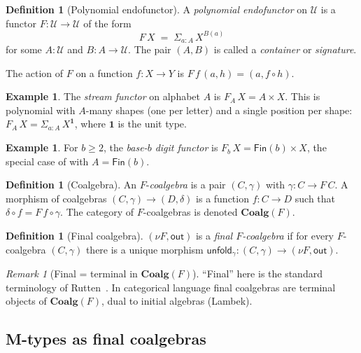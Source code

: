 \documentclass[12pt]{article}
\theoremstyle{definition}
\newtheorem{definition}[theorem]{Definition}
\newtheorem{example}[theorem]{Example}
\theoremstyle{remark}
\newtheorem{remark}[theorem]{Remark}
\newcommand{\Type}{\mathcal{U}}
\newcommand{\out}{\mathsf{out}}
\newcommand{\unfold}{\mathsf{unfold}}
\begin{document}
\begin{definition}[Polynomial endofunctor]
\label{def:poly}
A \emph{polynomial endofunctor} on $\Type$ is a functor
$F: \Type \to \Type$ of the form
\[
F\,X \;=\; \Sigma_{a:A}\,X^{B(a)}
\]
for some $A : \Type$ and $B : A \to \Type$. The pair $(A,B)$ is
called a \emph{container} or \emph{signature}.
\end{definition}

The action of $F$ on a function $f: X \to Y$ is
$F\,f\,(a, h) = (a, f \circ h)$.

\begin{example}\label{ex:streamfun}
The \emph{stream functor} on alphabet $A$ is $F_A\,X = A \times X$.
This is polynomial with $A$-many shapes (one per letter) and a
single position per shape: $F_A\,X = \Sigma_{a:A}\,X^{\mathbf{1}}$,
where $\mathbf{1}$ is the unit type.
\end{example}

\begin{example}\label{ex:digit}
For $b \geq 2$, the \emph{base-$b$ digit functor} is
$F_b\,X = \mathsf{Fin}(b) \times X$, the special case of
 with $A = \mathsf{Fin}(b)$.
\end{example}

\begin{definition}[Coalgebra]\label{def:coalg}
An $F$-\emph{coalgebra} is a pair $(C, \gamma)$ with
$\gamma: C \to F\,C$. A morphism of coalgebras
$(C,\gamma)\to(D,\delta)$ is a function $f: C \to D$ such that
$\delta \circ f = F\,f \circ \gamma$. The category of
$F$-coalgebras is denoted $\mathbf{Coalg}(F)$.
\end{definition}

\begin{definition}[Final coalgebra]\label{def:final}
$(\nu F, \out)$ is a \emph{final $F$-coalgebra} if for every
$F$-coalgebra $(C, \gamma)$ there is a unique morphism
$\unfold_\gamma: (C,\gamma) \to (\nu F, \out)$.
\end{definition}

\begin{remark}[Final = terminal in $\mathbf{Coalg}(F)$]
``Final'' here is the standard terminology of Rutten~\cite{rutten}.
In categorical language final coalgebras are terminal objects of
$\mathbf{Coalg}(F)$, dual to initial algebras (Lambek).
\end{remark}

\subsection{M-types as final coalgebras}
\end{document}
